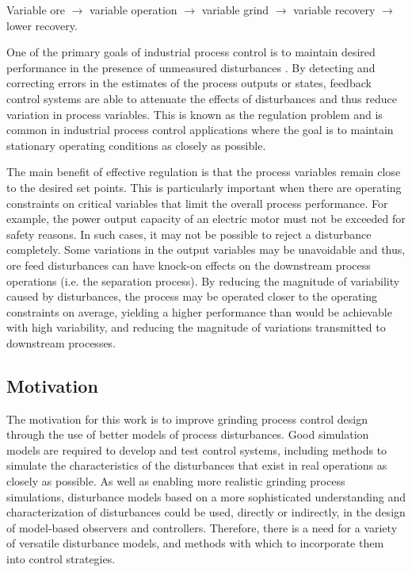 Variable ore $\to$ variable operation $\to$ variable grind $\to$ variable recovery $\to$ lower recovery. 

One of the primary goals of industrial process control is to maintain desired performance in the presence of unmeasured disturbances \citep{astrom_computer_1997}. By detecting and correcting errors in the estimates of the process outputs or states, feedback control systems are able to attenuate the effects of disturbances and thus reduce variation in process variables. This is known as the regulation problem and is common in industrial process control applications where the goal is to maintain stationary operating conditions as closely as possible.

The main benefit of effective regulation is that the process variables remain close to the desired set points. This is particularly important when there are operating constraints on critical variables that limit the overall process performance. For example, the power output capacity of an electric motor must not be exceeded for safety reasons. In such cases, it may not be possible to reject a disturbance completely. Some variations in the output variables may be unavoidable and thus, ore feed disturbances can have knock-on effects on the downstream process operations (i.e. the separation process). By reducing the magnitude of variability caused by disturbances, the process may be operated closer to the operating constraints on average, yielding a higher performance than would be achievable with high variability, and reducing the magnitude of variations transmitted to downstream processes.

\subsection*{Motivation}

The motivation for this work is to improve grinding process control design through the use of better models of process disturbances. Good simulation models are required to develop and test control systems, including methods to simulate the characteristics of the disturbances that exist in real operations as closely as possible. As well as enabling more realistic grinding process simulations, disturbance models based on a more sophisticated understanding and characterization of disturbances could be used, directly or indirectly, in the design of model-based observers and controllers. Therefore, there is a need for a variety of versatile disturbance models, and methods with which to incorporate them into control strategies.

